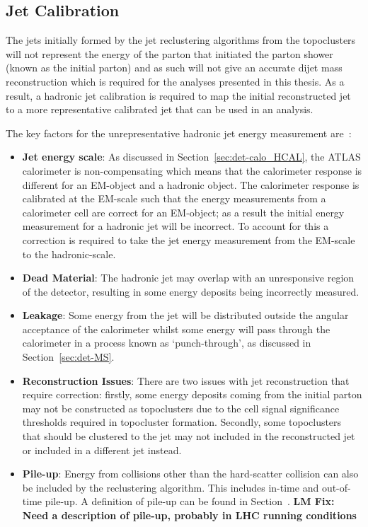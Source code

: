 \subsection{Jet Calibration}
\label{sec:obj-jets_calib}

The jets initially formed by the jet reclustering algorithms from the topoclusters
will not represent the energy of the parton that initiated the parton shower (known as the initial parton)
and as such will not give an accurate dijet mass reconstruction which is required for the analyses presented in this thesis.
As a result, a hadronic jet calibration is required to map the initial reconstructed jet
to a more representative calibrated jet that can be used in an analysis.

\noindent
The key factors for the unrepresentative hadronic jet energy measurement are~\cite{det-thesis_kate,obj-jets_calib_2015}:
\begin{itemize}[leftmargin=*]
\item\textbf{Jet energy scale}:
  As discussed in Section~\ref{sec:det-calo_HCAL}, the ATLAS calorimeter is non-compensating which means that
  the calorimeter response is different for an EM-object and a hadronic object.
  The calorimeter response is calibrated at the EM-scale such that the energy measurements from a calorimeter cell
  are correct for an EM-object;
  as a result the initial energy measurement for a hadronic jet will be incorrect.
  To account for this a correction is required to take the jet energy measurement from the EM-scale to the hadronic-scale.\vspace{0.5em}
\item\textbf{Dead Material}:
  The hadronic jet may overlap with an unresponsive region of the detector,
  resulting in some energy deposits being incorrectly measured.\vspace{0.5em}
\item\textbf{Leakage}:
  Some energy from the jet will be distributed outside the angular acceptance of the calorimeter
  whilst some energy will pass through the calorimeter in a process known as `punch-through', as discussed in Section~\ref{sec:det-MS}.\vspace{0.5em}
\item\textbf{Reconstruction Issues}:
  There are two issues with jet reconstruction that require correction:
  firstly, some energy deposits coming from the initial parton may not be constructed as topoclusters due to the cell signal significance thresholds required in topocluster formation.
  Secondly, some topoclusters that should be clustered to the jet may not included in the reconstructed jet or included in a different jet instead.\vspace{0.5em}
\item\textbf{Pile-up}:
  Energy from collisions other than the hard-scatter collision can also be included by the reclustering algorithm.
  This includes in-time and out-of-time pile-up.
  A  definition of pile-up can be found in Section~\cite{}. \textbf{LM Fix: Need a description of pile-up, probably in LHC running conditions}
\end{itemize}

